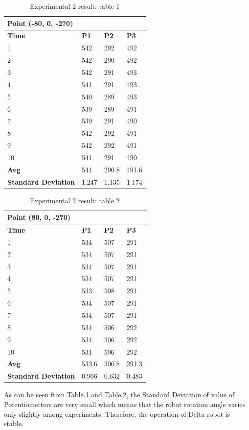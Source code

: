 \begin{table}[H]
\centering
\caption{Experimental 2 result: table 1}
\label{tab:experiment_2_table_1}
\begin{tabular}{ | l | l | l | l | }
\hline
	\multicolumn{4}{|l|}{\textbf{Point (-80, 0, -270)}} \\ \hline
	\textbf{Time} & \textbf{P1} & \textbf{P2} & \textbf{P3} \\ \hline
	1 & 542 & 292 & 492 \\ \hline
	2 & 542 & 290 & 492 \\ \hline
	3 & 542 & 291 & 493 \\ \hline
	4 & 541 & 291 & 493 \\ \hline
	5 & 540 & 289 & 493 \\ \hline
	6 & 539 & 289 & 491 \\ \hline
	7 & 539 & 291 & 490 \\ \hline
	8 & 542 & 292 & 491 \\ \hline
	9 & 542 & 292 & 491 \\ \hline
	10 & 541 & 291 & 490 \\ \hline
	\textbf{Avg} & 541 & 290.8 & 491.6 \\ \hline
	\textbf{Standard Deviation} & 1.247 & 1.135 & 1.174 \\ \hline
\end{tabular}
\end{table}

\begin{table}[H]
\centering
\caption{Experimental 2 result: table 2}
\label{tab:experiment_2_table_2}
\begin{tabular}{ | l | l | l | l | }
\hline
	\multicolumn{4}{|l|}{\textbf{Point (80, 0, -270)}} \\ \hline
	\textbf{Time} & \textbf{P1} & \textbf{P2} & \textbf{P3} \\ \hline
	1 & 534 & 507 & 291 \\ \hline
	2 & 534 & 507 & 291 \\ \hline
	3 & 534 & 507 & 291 \\ \hline
	4 & 534 & 507 & 291 \\ \hline
	5 & 533 & 508 & 291 \\ \hline
	6 & 534 & 507 & 291 \\ \hline
	7 & 534 & 507 & 291 \\ \hline
	8 & 534 & 506 & 292 \\ \hline
	9 & 534 & 506 & 292 \\ \hline
	10 & 531 & 506 & 292 \\ \hline
	\textbf{Avg} & 533.6 & 506.8 & 291.3 \\ \hline
	\textbf{Standard Deviation} & 0.966 & 0.632 & 0.483 \\ \hline
\end{tabular}
\end{table}
As can be seen from Table.\ref{tab:experiment_2_table_1} and Table.\ref{tab:experiment_2_table_2}, the Standard Deviation of value of Potentiometters are very small which means that the robot rotation angle varies only slightly among experiments. Therefore, the operation of Delta-robot is stable.

